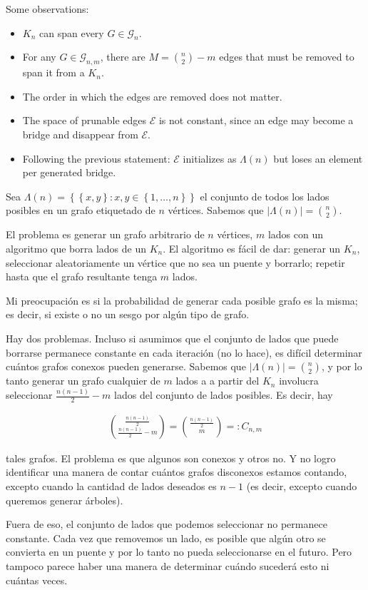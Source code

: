\documentclass[a4paper, 12pt]{article}
\begin{document}
Some observations:

\begin{itemize}
    \item $K_n$ can span every $G \in \mathcal{G}_n$.
    \item For any $G \in \mathcal{G}_{n, m}$, there are $M = \binom{n}{2} - m$ edges that must be 
        removed to span it from a $K_n$.
    \item The order in which the edges are removed does not matter.
    \item The space of prunable edges $\mathcal{E}$ is not constant, since an edge may become 
        a bridge and disappear from $\mathcal{E}$.
    \item Following the previous statement: $\mathcal{E}$ initializes as $\Lambda(n)$ but 
        loses an element per generated bridge.
\end{itemize}

Sea $\Lambda(n) = \left\{ \left\{ x, y \right\} : x, y \in \left\{ 1,\ldots,n
\right\}  \right\} $ el conjunto de todos los lados posibles en un grafo
etiquetado de $n$ vértices. Sabemos que $|\Lambda(n)| = \binom{n}{2}$.

El problema es generar un grafo arbitrario de $n$ vértices, $m$ lados con un
algoritmo que borra lados de un $K_n$. El algoritmo es fácil de dar: generar un
$K_n$, seleccionar aleatoriamente un vértice que no sea un puente y borrarlo;
repetir hasta que el grafo resultante tenga $m$ lados.

Mi preocupación es si la probabilidad de generar cada posible grafo es la
misma; es decir, si existe o no un sesgo por algún tipo de grafo.

Hay dos problemas. Incluso si asumimos que el conjunto de lados que puede
borrarse permanece constante en cada iteración (no lo hace), es difícil
determinar cuántos grafos conexos pueden generarse. Sabemos que $|\Lambda(n)| =
\binom{n}{2}$, y por lo tanto generar un grafo cualquier de $m$ lados a a
partir del $K_n$ involucra seleccionar $\frac{ n(n-1) }{2} - m$ lados del
conjunto de lados posibles. Es decir, hay

\begin{align*}
    \binom{\frac{n(n-1)}{2}}{\frac{n(n-1)}{2} - m} = \binom{\frac{n(n-1)}{2}}{m} =: C_{n, m}
\end{align*}

tales grafos. El problema es que algunos son conexos y otros no. Y no logro
identificar una manera de contar cuántos grafos disconexos estamos contando,
excepto cuando la cantidad de lados deseados es $n-1$ (es decir, excepto cuando
queremos generar árboles).

Fuera de eso, el conjunto de lados que podemos seleccionar no permanece
constante. Cada vez que removemos un lado, es posible que algún otro se
convierta en un puente y por lo tanto no pueda seleccionarse en el futuro. Pero
tampoco parece haber una manera de determinar cuándo sucederá esto ni cuántas
veces.
\end{document}
